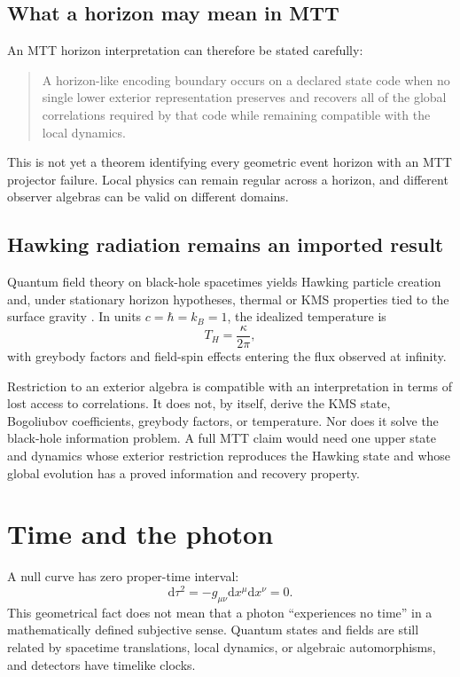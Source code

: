 \documentclass[11pt,a4paper]{article}
\numberwithin{equation}{section}
\theoremstyle{definition}
\theoremstyle{remark}
\newcommand{\dd}{\mathrm{d}}
\begin{document}
\subsection{What a horizon may mean in MTT}

An MTT horizon interpretation can therefore be stated carefully:
\begin{quote}
A horizon-like encoding boundary occurs on a declared state code when no
single lower exterior representation preserves and recovers all of the
global correlations required by that code while remaining compatible
with the local dynamics.
\end{quote}
This is not yet a theorem identifying every geometric event horizon with
an MTT projector failure.  Local physics can remain regular across a
horizon, and different observer algebras can be valid on different
domains.

\subsection{Hawking radiation remains an imported result}

Quantum field theory on black-hole spacetimes yields Hawking particle
creation and, under stationary horizon hypotheses, thermal or KMS
properties tied to the surface gravity
\cite{Hawking1975,KayWald1991,Wald1994}.  In units
\(c=\hbar=k_B=1\), the idealized temperature is
\[
T_H=\frac{\kappa}{2\pi},
\]
with greybody factors and field-spin effects entering the flux observed
at infinity.

Restriction to an exterior algebra is compatible with an interpretation
in terms of lost access to correlations.  It does not, by itself, derive
the KMS state, Bogoliubov coefficients, greybody factors, or temperature.
Nor does it solve the black-hole information problem.  A full MTT claim
would need one upper state and dynamics whose exterior restriction
reproduces the Hawking state and whose global evolution has a proved
information and recovery property.

\section{Time and the photon}

A null curve has zero proper-time interval:
\[
\dd\tau^2=-g_{\mu\nu}\dd x^\mu\dd x^\nu=0.
\]
This geometrical fact does not mean that a photon ``experiences no time''
in a mathematically defined subjective sense.  Quantum states and fields
are still related by spacetime translations, local dynamics, or
algebraic automorphisms, and detectors have timelike clocks.
\end{document}
